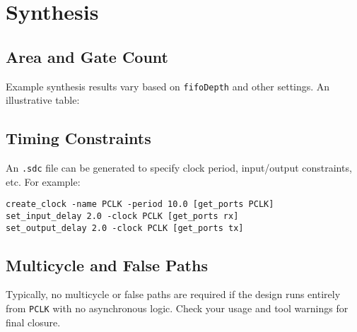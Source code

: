 \section{Synthesis}

\subsection{Area and Gate Count}
Example synthesis results vary based on \texttt{fifoDepth} and other settings. An illustrative table:



\subsection{Timing Constraints}
An \texttt{.sdc} file can be generated to specify clock period, input/output constraints, etc. For example:
\begin{verbatim}
create_clock -name PCLK -period 10.0 [get_ports PCLK]
set_input_delay 2.0 -clock PCLK [get_ports rx]
set_output_delay 2.0 -clock PCLK [get_ports tx]
\end{verbatim}

\subsection{Multicycle and False Paths}
Typically, no multicycle or false paths are required if the design runs entirely from \texttt{PCLK} with no asynchronous logic. Check your usage and tool warnings for final closure.
